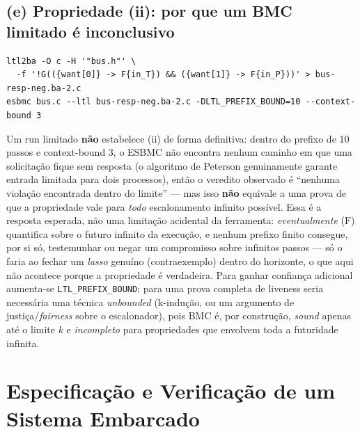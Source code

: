 \documentclass[12pt,a4paper]{article}
\begin{document}
\subsection{(e) Propriedade (ii): por que um BMC limitado \'e inconclusivo}

\begin{lstlisting}[style=shstyle]
ltl2ba -O c -H '"bus.h"' \
  -f '!G(({want[0]} -> F{in_T}) && ({want[1]} -> F{in_P}))' > bus-resp-neg.ba-2.c
esbmc bus.c --ltl bus-resp-neg.ba-2.c -DLTL_PREFIX_BOUND=10 --context-bound 3
\end{lstlisting}

\begin{tcolorbox}[resultbox]
Um run limitado \textbf{n\~ao} estabelece (ii) de forma definitiva: dentro do prefixo de
10 passos e context-bound 3, o ESBMC n\~ao encontra nenhum caminho em que uma solicita\c{c}\~ao
fique sem resposta (o algoritmo de Peterson genuinamente garante entrada limitada para dois
processos), ent\~ao o veredito observado \'e ``nenhuma viola\c{c}\~ao encontrada dentro do
limite'' --- mas isso \textbf{n\~ao} equivale a uma prova de que a propriedade vale para
\emph{todo} escalonamento infinito poss\'ivel. Essa \'e a resposta esperada, n\~ao uma
limita\c{c}\~ao acidental da ferramenta: \emph{eventualmente} ($\mathrm{F}$) quantifica
sobre o futuro infinito da execu\c{c}\~ao, e nenhum prefixo finito consegue, por si s\'o,
testemunhar ou negar um compromisso sobre infinitos passos --- s\'o o faria ao fechar um
\emph{lasso} genu\'ino (contraexemplo) dentro do horizonte, o que aqui n\~ao acontece porque
a propriedade \'e verdadeira. Para ganhar confian\c{c}a adicional aumenta-se
\texttt{LTL\_PREFIX\_BOUND}; para uma prova completa de liveness seria necess\'aria uma
t\'ecnica \emph{unbounded} (k-indu\c{c}\~ao, ou um argumento de justi\c{c}a/\emph{fairness}
sobre o escalonador), pois BMC \'e, por constru\c{c}\~ao, \emph{sound} apenas at\'e o
limite $k$ e \emph{incompleto} para propriedades que envolvem toda a futuridade infinita.
\end{tcolorbox}

\newpage

\section{Especifica\c{c}\~ao e Verifica\c{c}\~ao de um Sistema Embarcado}
\end{document}
